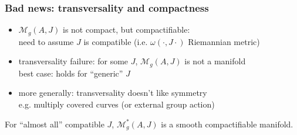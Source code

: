 \begin{frame}
  \frametitle{Bad news: transversality and compactness}
  \begin{itemize}
    \item $\mathcal{M}_g(A,J)$ is not compact, but compactifiable:\\
    need to assume $J$ is compatible (i.e. $\omega(\cdot,J\cdot)$ Riemannian metric)
    \item transversality failure: for some $J$, $\mathcal{M}_g(A,J)$ is not a manifold\\
    best case: holds for ``generic'' $J$
    \item more generally: transversality doesn't like symmetry\\
    e.g. multiply covered curves (or external group action)
  \end{itemize}
\begin{theorem}
  For ``almost all'' compatible $J$, $\mathcal{M}^*_g(A,J)$ is a smooth compactifiable manifold.
\end{theorem}
\end{frame}
